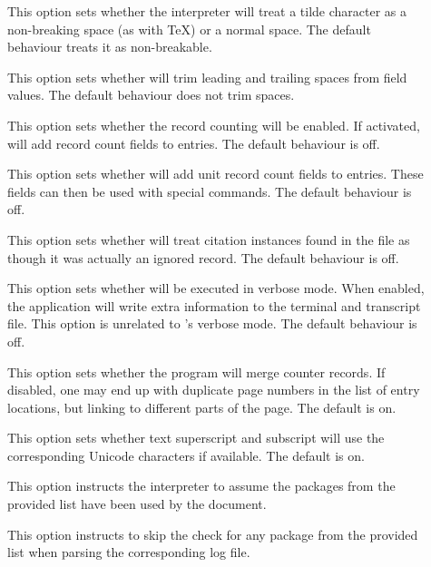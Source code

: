 \begin{description}
\begin{description}
\item[] This option sets whether the interpreter will treat a tilde character as a non-breaking space (as with \TeX) or a normal space. The default behaviour treats it as non-breakable.

\item[] This option sets whether  will trim leading and trailing spaces from field values. The default behaviour does not trim spaces.

\item[] This option sets whether the record counting will be enabled. If activated,  will add record count fields to entries. The default behaviour is off.

\item[] This option sets whether  will add unit record count fields to entries. These fields can then be used with special commands. The default behaviour is off.

\item[] This option sets whether  will treat citation instances found in the  file as though it was actually an ignored record. The default behaviour is off.

\item[] This option sets whether  will be executed in verbose mode. When enabled, the application will write extra information to the terminal and transcript file. This option is unrelated to \arara's verbose mode. The default behaviour is off.

\item[] This option sets whether the program will merge  counter records. If disabled, one may end up with duplicate page numbers in the list of entry locations, but linking to different parts of the page. The default is on.

\item[] This option sets whether text superscript and subscript will use the corresponding Unicode characters if available. The default is on.

\item[] This option instructs the interpreter to assume the packages from the provided list have been used by the document.

\item[] This option instructs  to skip the check for any package from the provided list when parsing the corresponding log file.


\end{description}
\end{description}

